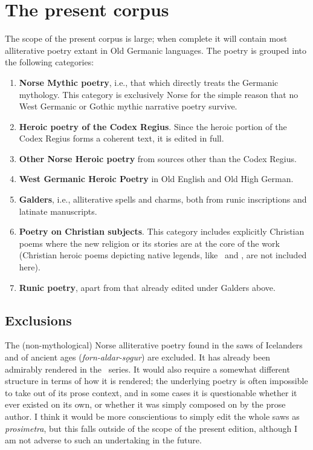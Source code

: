 \section{The present corpus}
  The scope of the present corpus is large; when complete it will contain most alliterative poetry extant in Old Germanic languages.  The poetry is grouped into the following categories:
  \begin{enumerate}
    \item \textbf{Norse Mythic poetry}, i.e., that which directly treats the Germanic mythology.  This category is exclusively Norse for the simple reason that no West Germanic or Gothic mythic narrative poetry survive.
    \item \textbf{Heroic poetry of the Codex Regius}.  Since the heroic portion of the Codex Regius forms a coherent text, it is edited in full.
    \item \textbf{Other Norse Heroic poetry} from sources other than the Codex Regius.
    \item \textbf{West Germanic Heroic Poetry} in Old English and Old High German.
    \item \textbf{Galders}, i.e., alliterative spells and charms, both from runic inscriptions and latinate manuscripts.
    \item \textbf{Poetry on Christian subjects}.  This category includes explicitly Christian poems where the new religion or its stories are at the core of the work (Christian heroic poems depicting native legends, like \Beowulf\ and \Hildebrandslied, are not included here).
    \item \textbf{Runic poetry}, apart from that already edited under Galders above.
  \end{enumerate}

  \subsection{Exclusions}
    The (non-mythological) Norse alliterative poetry found in the saws of Icelanders and of ancient ages (\emph{forn-aldar-sǫgur}) are excluded.  It has already been admirably rendered in the \Skp\ series.  It would also require a somewhat different structure in terms of how it is rendered; the underlying poetry is often impossible to take out of its prose context, and in some cases it is questionable whether it ever existed on its own, or whether it was simply composed on by the prose author.  I think it would be more conscientious to simply edit the whole saws as \emph{prosimetra}, but this falls outside of the scope of the present edition, although I am not adverse to such an undertaking in the future.

